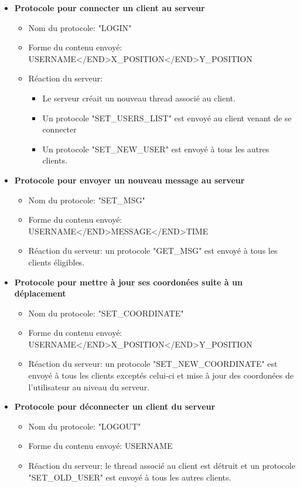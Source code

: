 \documentclass[a4paper,12pt]{report}
\begin{document}
    \begin{itemize}
      \item \textbf{Protocole pour connecter un client au serveur}
        \begin{itemize}
          \item Nom du protocole: "LOGIN"
          \item Forme du contenu envoyé: USERNAME</END>X\_POSITION</END>Y\_POSITION
          \item Réaction du serveur:
            \begin{itemize}
              \item Le serveur créait un nouveau thread associé au client.
              \item Un protocole "SET\_USERS\_LIST" est envoyé au client venant de se connecter
              \item Un protocole "SET\_NEW\_USER" est envoyé à tous les autres clients.
            \end{itemize}
        \end{itemize}
      \item \textbf{Protocole pour envoyer un nouveau message au serveur}
        \begin{itemize}
          \item Nom du protocole: "SET\_MSG"
          \item Forme du contenu envoyé: USERNAME</END>MESSAGE</END>TIME
          \item Réaction du serveur: un protocole "GET\_MSG" est envoyé à tous les clients éligibles.
        \end{itemize}
      \item \textbf{Protocole pour mettre à jour ses coordonées suite à un déplacement}
        \begin{itemize}
          \item Nom du protocole: "SET\_COORDINATE"
          \item Forme du contenu envoyé: USERNAME</END>X\_POSITION</END>Y\_POSITION
          \item Réaction du serveur: un protocole "SET\_NEW\_COORDINATE" est envoyé à tous les clients exceptés celui-ci et mise à jour des coordonées de l'utilisateur au niveau du serveur.
        \end{itemize}
      \item \textbf{Protocole pour déconnecter un client du serveur}
        \begin{itemize}
          \item Nom du protocole: "LOGOUT"
          \item Forme du contenu envoyé: USERNAME
          \item Réaction du serveur: le thread associé au client est détruit et un protocole "SET\_OLD\_USER" est envoyé à tous les autres clients.
        \end{itemize}
    \end{itemize}
\end{document}
